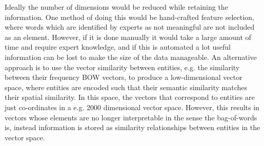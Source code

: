 Ideally the number of dimensions would be reduced while retaining the information. One method of doing this would be hand-crafted feature selection, where words which are identified by experts as not meaningful are not included as an element. However, if it is done manually it would take a large amount of time and require expert knowledge, and  if this is automated a lot useful information can be lost to make the size of the data manageable. An alternative approach is to use the vector similarity between entities, e.g. the similarity between their frequency BOW vectors, to produce a low-dimensional vector space, where entities are encoded  such that their semantic similarity matches their spatial similarity.  In this space, the vectors that correspond to entities are just co-ordinates in a e.g. 2000 dimensional vector space. However, this results in vectors whose elements are no longer interpretable in the sense the bag-of-words is, instead information is stored as similarity relationships between entities in the vector space.






